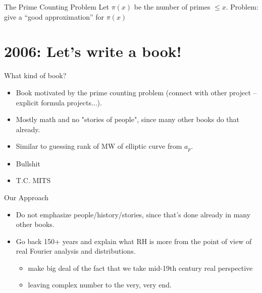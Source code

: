 \documentclass[draft]{beamer}
\begin{document}
\begin{frame}{The Prime Counting Problem}
  Let $\pi(x)$ be the number of primes $\leq x$.
  Problem: give a ``good approximation'' for $\pi(x)$

\end{frame}

\section{2006: Let's write a book!}

\begin{frame}{What kind of book?}
  \begin{itemize}
    \item   Book motivated by the prime counting problem (connect with other project -- explicit formula projects...).
    \item Mostly math and no "stories of people", since many other books do that already.
    \item  Similar to guessing rank of MW of elliptic curve from $a_p$.
    \item Bullshit
    \item T.\thinspace{}C. MITS
  \end{itemize}

\end{frame}

\begin{frame}{Our Approach}
  \begin{itemize}
    \item Do not emphasize people/history/stories, since that's done already in many other books.
    \item   Go back 150+ years and explain what RH is more from the point of view of real Fourier analysis and distributions.
          \begin{itemize}
            \item make big deal of the fact that we take mid-19th century real perspective
            \item leaving complex number to the very, very end.
          \end{itemize}
  \end{itemize}
\end{frame}
\end{document}
